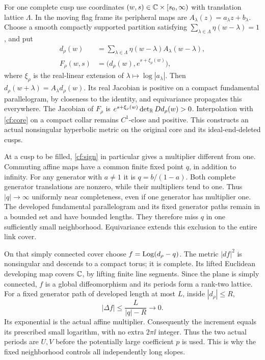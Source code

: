 For one complete cusp use coordinates
$(w,s)\in\mathbb C\times[s_0,\infty)$ with translation lattice
$\Lambda$. In the moving flag frame its peripheral maps are
$A_\lambda(z)=a_\lambda z+b_\lambda$.
Choose a smooth compactly supported partition satisfying
$\sum_{\lambda\in\Lambda}\eta(w-\lambda)=1$, and put
\begin{equation}\label{cf:link}
\begin{split}
 d_\rho(w)&=\sum_{\lambda\in\Lambda}
            \eta(w-\lambda)A_\lambda(w-\lambda),\\
 F_\rho(w,s)&=\bigl(d_\rho(w),e^{s+\xi_\rho(w)}\bigr),
\end{split}
\end{equation}
where $\xi_\rho$ is the real-linear extension of
$\lambda\mapsto\log|a_\lambda|$.
Then $d_\rho(w+\lambda)=A_\lambda d_\rho(w)$.
Its real Jacobian is positive on a compact fundamental
parallelogram, by closeness to the identity, and equivariance
propagates this everywhere. The Jacobian of $F_\rho$ is
$e^{s+\xi_\rho(w)}\det_{\mathbb R}Dd_\rho(w)>0$.
Interpolation with \eqref{cf:core} on a compact collar remains
$C^1$-close and positive.
This constructs an actual nonsingular hyperbolic metric on
the original core and its ideal-end-deleted cusps.

At a cusp to be filled, \eqref{cf:sign} in particular gives
a multiplier different from one. Commuting affine maps have
a common finite fixed point $q$, in addition to infinity.
For any generator with $a\ne1$ it is $q=b/(1-a)$.
Both complete generator translations are nonzero, while their
multipliers tend to one. Thus $|q|\to\infty$ uniformly near
completeness, even if one generator has multiplier one.
The developed fundamental parallelogram and its fixed generator
paths remain in a bounded set and have bounded lengths.
They therefore miss $q$ in one sufficiently small neighborhood.
Equivariance extends this exclusion to the entire link cover.

On that simply connected cover choose
$f=\operatorname{Log}(d_\rho-q)$. The metric $|df|^2$ is nonsingular and
descends to a compact torus; it is complete. Its lifted
Euclidean developing map covers $\mathbb C$, by lifting finite line
segments. Since the plane is simply connected, $f$ is a
global diffeomorphism and its periods form a rank-two lattice.
For a fixed generator path of developed length at most $L$,
inside $|d_\rho|\le R$,
\begin{equation}\label{cf:small-period}
 |\Delta f|\le \frac{L}{|q|-R}\longrightarrow0.
\end{equation}
Its exponential is the actual affine multiplier. Consequently
the increment equals its prescribed small logarithm, with
no extra $2\pi\ii$ integer. Thus the two actual periods are
$U,V$ before the potentially large coefficient $p$ is used.
This is why the fixed neighborhood controls all independently
long slopes.

